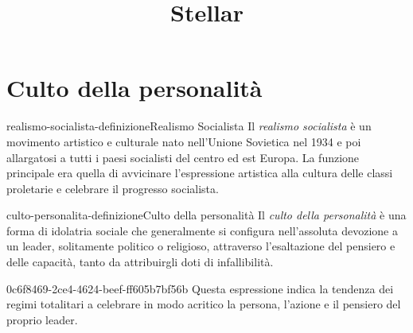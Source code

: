 \documentclass[preview]{standalone}
\begin{document}
\title{Stellar}
\genpage

\section{Culto della personalità}

\begin{snippetdefinition}{realismo-socialista-definizione}{Realismo Socialista}
    Il \textit{realismo socialista} è un movimento artistico e culturale nato nell'Unione Sovietica nel 1934 e poi allargatosi a tutti i paesi socialisti del centro ed est Europa. La funzione principale era quella di avvicinare l'espressione artistica alla cultura delle classi proletarie e celebrare il progresso socialista.
\end{snippetdefinition}

\begin{snippetdefinition}{culto-personalita-definizione}{Culto della personalità}
    Il \textit{culto della personalità} è una forma di idolatria sociale che
    generalmente si configura nell'assoluta devozione a un leader,
    solitamente politico o religioso, attraverso l'esaltazione del pensiero e 
    delle capacità, tanto da attribuirgli doti di infallibilità.
\end{snippetdefinition}

\begin{snippet}{0c6f8469-2ce4-4624-beef-ff605b7bf56b}
    Questa espressione indica la tendenza dei regimi totalitari
    a celebrare in modo acritico la persona, l'azione e il pensiero del proprio leader.
\end{snippet}

\end{document}
